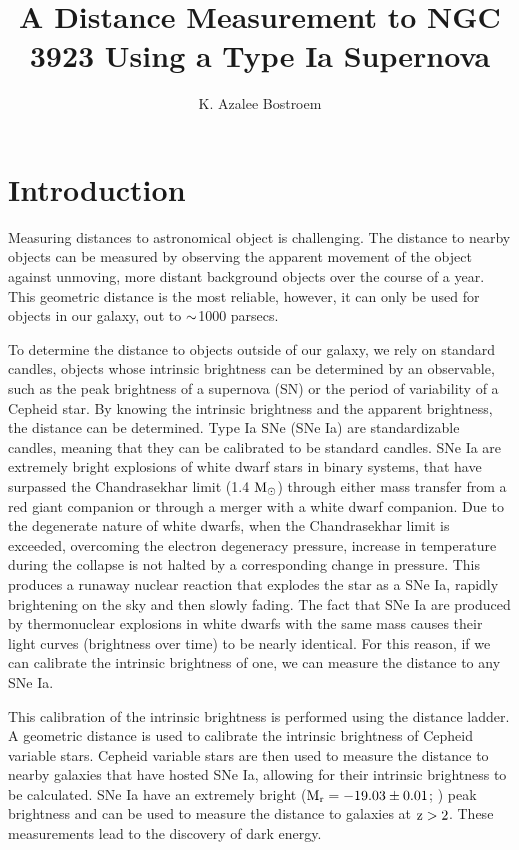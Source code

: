 \documentclass[11pt, oneside]{article}   	%
\title{A Distance Measurement to NGC 3923 Using a Type Ia Supernova}
\author{K. Azalee Bostroem}
\begin{document}
\maketitle
\section{Introduction}
Measuring distances to astronomical object is challenging. 
The distance to nearby objects can be measured by observing the apparent movement of the object against unmoving, more distant background objects over the course of a year.
This geometric distance is the most reliable, however, it can only be used for objects in our galaxy, out to $\rm{\sim}$1000 parsecs.

To determine the distance to objects outside of our galaxy, we rely on standard candles, objects whose intrinsic brightness can be determined by an observable, such as the peak brightness of a supernova (SN) or the period of variability of a Cepheid star. 
By knowing the intrinsic brightness and the apparent brightness, the distance can be determined.
Type Ia SNe (SNe Ia) are standardizable candles, meaning that they can be calibrated to be standard candles.
SNe Ia are extremely bright explosions of white dwarf stars in binary systems, that have surpassed the Chandrasekhar limit (1.4 $\rm{M_{\odot}}$) through either mass transfer from a red giant companion or through a merger with a white dwarf companion.
Due to the degenerate nature of white dwarfs, when the Chandrasekhar limit is exceeded, overcoming the electron degeneracy pressure, increase in temperature during the collapse is not halted by a corresponding change in pressure.
This produces a runaway nuclear reaction that explodes the star as a SNe Ia, rapidly brightening on the sky and then slowly fading.
The fact that SNe Ia are produced by thermonuclear explosions in white dwarfs with the same mass causes their light curves (brightness over time) to be nearly identical.
For this reason, if we can calibrate the intrinsic brightness of one, we can measure the distance to any SNe Ia. 

This calibration of the intrinsic brightness is performed using the distance ladder. 
A geometric distance is used to calibrate the intrinsic brightness of Cepheid variable stars.
Cepheid variable stars are then used to measure the distance to nearby galaxies that have hosted SNe Ia, allowing for their intrinsic brightness to be calculated.
SNe Ia have an extremely bright ($\rm{M_{r} = -19.03 \pm 0.01}$; \citet{2010folatelli}) peak brightness and can be used to measure the distance to galaxies at $\rm{z>2}$.
These measurements lead to the discovery of dark energy.
\end{document}
